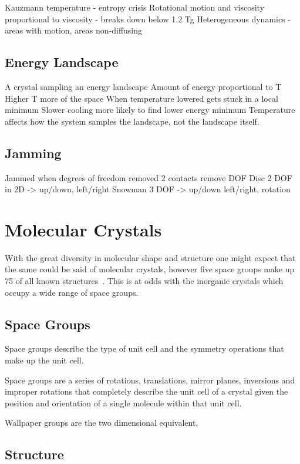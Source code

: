 Kauzmann temperature - entropy crisis
Rotational motion and viscosity proportional to viscosity - breaks down below 1.2 Tg
Heterogeneous dynamics - areas with motion, areas non-diffusing

\subsection{Energy Landscape}
A crystal sampling an energy landscape
Amount of energy proportional to T
Higher T more of the space
When temperature lowered gets stuck in a local minimum
Slower cooling more likely to find lower energy minimum
Temperature affects how the system samples the landscape, not the landscape itself.

\subsection{Jamming}
Jammed when degrees of freedom removed
2 contacts remove DOF
Disc 2 DOF in 2D -> up/down, left/right
Snowman 3 DOF -> up/down left/right, rotation

\section{Molecular Crystals}

With the great diversity in molecular shape and structure one might expect that the same could be said of molecular crystals, however five space groups make up \si{75}{\percent} of all known structures~\cite{brock:94}. This is at odds with the inorganic crystals which occupy a wide range of space groups.

\subsection{Space Groups}

Space groups describe the type of unit cell and the symmetry operations that make up the unit cell. 


Space groups are a series of rotations, translations, mirror planes, inversions and improper rotations that completely describe the unit cell of a crystal given the position and orientation of a single molecule within that unit cell.

Wallpaper groups are the two dimensional equivalent,

\subsection{Structure}

